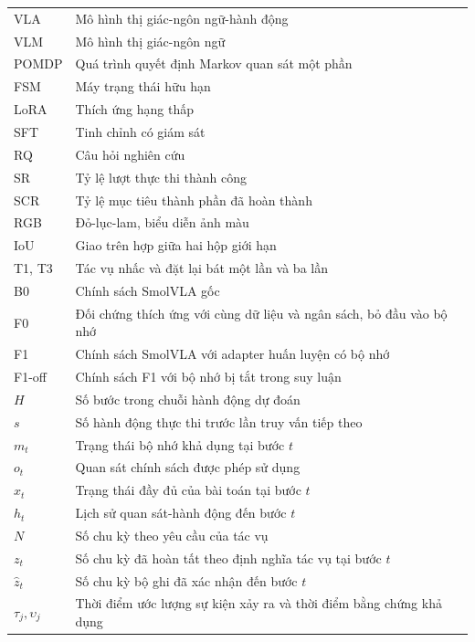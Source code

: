 \documentclass[fontsize=13pt,paper=a4,DIV=calc,oneside,open=any,headings=normal,numbers=noenddot]{scrbook}
\begin{document}

\pagestyle{empty}



\frontmatter
\pagestyle{scrheadings}
\tableofcontents
\listoffigures
\listoftables
{}
\begin{longtable}{p{}p{}}
VLA & Mô hình thị giác-ngôn ngữ-hành động\\
VLM & Mô hình thị giác-ngôn ngữ\\
POMDP & Quá trình quyết định Markov quan sát một phần\\
FSM & Máy trạng thái hữu hạn\\
LoRA & Thích ứng hạng thấp\\
SFT & Tinh chỉnh có giám sát\\
RQ & Câu hỏi nghiên cứu\\
SR & Tỷ lệ lượt thực thi thành công\\
SCR & Tỷ lệ mục tiêu thành phần đã hoàn thành\\
RGB & Đỏ-lục-lam, biểu diễn ảnh màu\\
IoU & Giao trên hợp giữa hai hộp giới hạn\\
T1, T3 & Tác vụ nhấc và đặt lại bát một lần và ba lần\\
B0 & Chính sách SmolVLA gốc\\
F0 & Đối chứng thích ứng với cùng dữ liệu và ngân sách, bỏ đầu vào bộ nhớ\\
F1 & Chính sách SmolVLA với adapter huấn luyện có bộ nhớ\\
F1-off & Chính sách F1 với bộ nhớ bị tắt trong suy luận\\
$H$ & Số bước trong chuỗi hành động dự đoán\\
$s$ & Số hành động thực thi trước lần truy vấn tiếp theo\\
$m_t$ & Trạng thái bộ nhớ khả dụng tại bước $t$\\
$o_t$ & Quan sát chính sách được phép sử dụng\\
$x_t$ & Trạng thái đầy đủ của bài toán tại bước $t$\\
$h_t$ & Lịch sử quan sát-hành động đến bước $t$\\
$N$ & Số chu kỳ theo yêu cầu của tác vụ\\
$z_t$ & Số chu kỳ đã hoàn tất theo định nghĩa tác vụ tại bước $t$\\
$\hat z_t$ & Số chu kỳ bộ ghi đã xác nhận đến bước $t$\\
$\tau_j,\upsilon_j$ & Thời điểm ước lượng sự kiện xảy ra và thời điểm bằng chứng khả dụng\\
\end{longtable}
\mainmatter





\cleardoublepage
{}
{}


\end{document}
